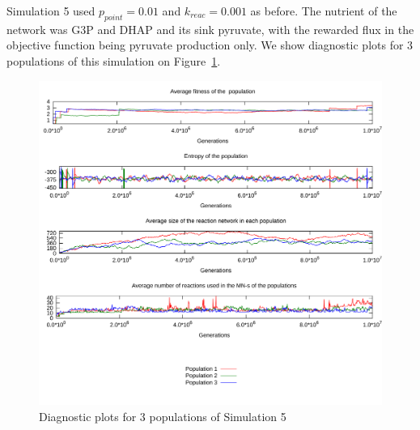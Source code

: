 \documentclass[a4paper,12pt]{article}
\begin{document}
Simulation 5 used $p_{point}=0.01$ and $k_{reac}=0.001$ as before. The nutrient of the network was G3P and DHAP and its sink pyruvate, with the rewarded flux in the objective function being pyruvate production only. We show diagnostic plots for $3$ populations of this simulation on Figure~\ref{fig:simulationpyruvonly}.

\begin{figure}[htpb]
	\centering
	\includegraphics[width=0.8\linewidth]{simulationpyruvonly.pdf}
	\caption{Diagnostic plots for 3 populations of Simulation 5}
	\label{fig:simulationpyruvonly}
\end{figure}
\end{document}
